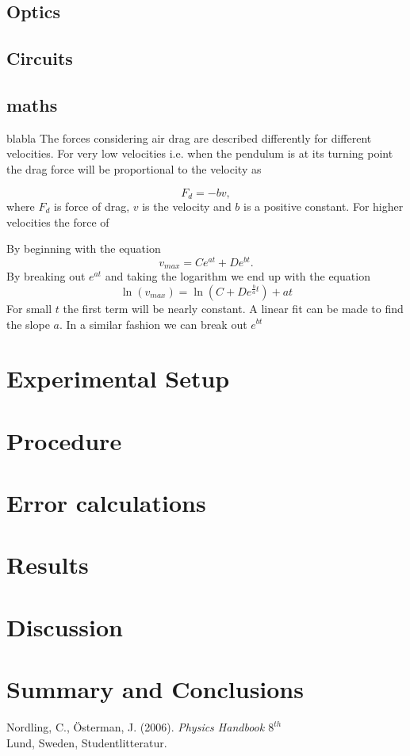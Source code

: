 \documentclass[11pt, a4paper]{article}
\begin{document}
\subsection{Optics}
\subsection{Circuits}
\subsection{maths}

blabla
The forces considering air drag are described differently for different velocities. For very low velocities i.e. when the pendulum is at its turning point the drag force will be proportional to the velocity as

\[
F_d = -bv,
\]
where $F_d$ is force of drag, $v$ is the velocity and $b$ is a positive constant.
For higher velocities the force of 


By beginning with the equation
\[
v_{max} = Ce^{at} + De^{bt}.
\]
By breaking out $e^{at}$ and taking the logarithm we end up with the equation
\[
\ln(v_{max}) = \ln(C + De^{\frac{b}{a}t}) + at
\]
For small $t$ the first term will be nearly constant. A linear fit can be made to find the slope $a$.
In a similar fashion we can break out $e^{bt}$

\section{Experimental Setup}
\section{Procedure}
\section{Error calculations}
\section{Results}
\section{Discussion}
\section{Summary and Conclusions}
\vfill

\begin{thebibliography}{99}
	 Nordling, C., Österman, J. (2006). 
  \textit{Physics Handbook  $8^{th}$}\\
  Lund, Sweden, Studentlitteratur.
\end{thebibliography}

\begin{appendix}
\end{appendix}

\end{document}
